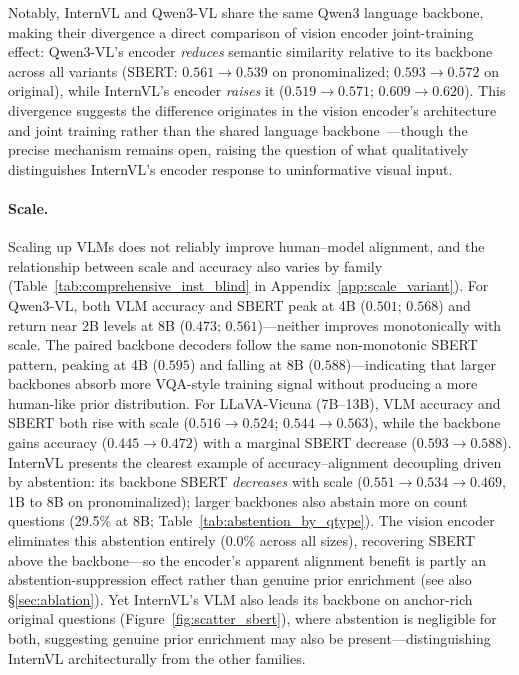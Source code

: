 \documentclass[letterpaper]{article}
\begin{document}
Notably, InternVL and Qwen3-VL share the same Qwen3 language backbone,
making their divergence a direct comparison of vision encoder joint-training effect: Qwen3-VL's
encoder \emph{reduces} semantic similarity relative to its backbone across all variants (SBERT: $0.561{\to}0.539$ on pronominalized; $0.593{\to}0.572$ on original), while InternVL's encoder \emph{raises} it ($0.519{\to}0.571$; $0.609{\to}0.620$).
This divergence suggests the difference originates in the vision encoder's architecture and joint training rather than the shared language backbone~\citep{tong2024eyes,mckinzie2024mm1}---though the precise mechanism remains open, raising the question of what qualitatively distinguishes InternVL's encoder response to uninformative visual input.

\paragraph{Scale.}
Scaling up VLMs does not reliably improve human--model alignment, and the
relationship between scale and accuracy also varies by family
(Table~\ref{tab:comprehensive_inst_blind} in Appendix~\ref{app:scale_variant}).
For Qwen3-VL, both VLM accuracy and SBERT peak at 4B ($0.501$; $0.568$) and return
near 2B levels at 8B ($0.473$; $0.561$)---neither improves monotonically with scale.
The paired backbone decoders follow the same non-monotonic SBERT pattern,
peaking at 4B ($0.595$) and falling at 8B ($0.588$)---indicating that
larger backbones absorb more VQA-style training signal without producing
a more human-like prior distribution.
For LLaVA-Vicuna (7B--13B), VLM accuracy and SBERT both rise with scale
($0.516{\to}0.524$; $0.544{\to}0.563$), while the backbone gains accuracy
($0.445{\to}0.472$) with a marginal SBERT decrease ($0.593{\to}0.588$).
InternVL presents the clearest example of accuracy--alignment decoupling driven by abstention: its backbone SBERT \emph{decreases} with scale ($0.551{\to}0.534{\to}0.469$, 1B to 8B on pronominalized); larger backbones also abstain more on count questions (29.5\% at 8B; Table~\ref{tab:abstention_by_qtype}).
The vision encoder eliminates this abstention entirely (0.0\% across all sizes), recovering SBERT above the backbone---so the encoder's apparent alignment benefit is partly an abstention-suppression effect rather than genuine prior enrichment (see also \S\ref{sec:ablation}).
Yet InternVL's VLM also leads its backbone on anchor-rich original questions (Figure~\ref{fig:scatter_sbert}), where abstention is negligible for both, suggesting genuine prior enrichment may also be present---distinguishing InternVL architecturally from the other families.
\end{document}
